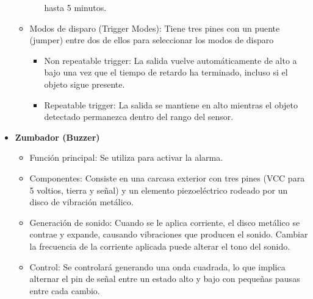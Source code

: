 \documentclass{report}
\begin{document}
\begin{itemize}
\begin{itemize}
\begin{itemize}
            hasta 5 minutos.
        \end{itemize}
        \item Modos de disparo (Trigger Modes): Tiene tres pines con un puente (jumper) entre dos de ellos para seleccionar los modos de disparo
        \begin{itemize}
            \item Non repeatable trigger: La salida vuelve automáticamente de alto a bajo una vez que el tiempo de retardo ha terminado, incluso 
            si el objeto sigue presente.
            \item Repeatable trigger: La salida se mantiene en alto mientras el objeto detectado permanezca dentro del rango del sensor.
        \end{itemize}
    \end{itemize}

    \item \textbf{Zumbador (Buzzer)}
    \begin{itemize}
        \item Función principal: Se utiliza para activar la alarma.
        \item Componentes: Consiste en una carcasa exterior con tres pines (VCC para 5 voltios, tierra y señal) y un elemento piezoeléctrico rodeado por 
        un disco de vibración metálico.
        \item Generación de sonido: Cuando se le aplica corriente, el disco metálico se contrae y expande, causando vibraciones que producen el sonido. 
        Cambiar la frecuencia de la corriente aplicada puede alterar el tono del sonido.
        \item Control: Se controlará generando una onda cuadrada, lo que implica alternar el pin de señal entre un estado alto y bajo con pequeñas pausas 
        entre cada cambio.
    \end{itemize}


\end{itemize}
\end{document}
